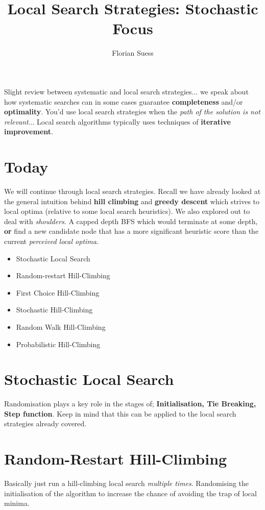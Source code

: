 \documentclass{article}
\begin{document}
\title{Local Search Strategies: Stochastic Focus}
\date{}
\author{Florian Suess}
\maketitle

Slight review between systematic and local search strategies... we speak about how systematic searches can in some cases guarantee \textbf{completeness} and/or \textbf{optimality}. You'd use local search strategies when the \emph{path of the solution is not relevant}... Local search algorithms typically uses techniques of \textbf{iterative improvement}.

\section{Today}
We will continue through local search strategies. Recall we have already looked at the general intuition behind \textbf{hill climbing} and \textbf{greedy descent} which strives to local optima (relative to some local search heuristics). We also explored out to deal with \emph{shoulders}. A capped depth BFS which would terminate at some depth, \textbf{or} find a new candidate node that has a more significant heuristic score than the current \emph{perceived local optima}.

\begin{itemize}
	\item Stochastic Local Search
	\item Random-restart Hill-Climbing
	\item First Choice Hill-Climbing
	\item Stochastic Hill-Climbing
	\item Random Walk Hill-Climbing
	\item Probabilistic Hill-Climbing
\end{itemize}

\section{Stochastic Local Search}
Randomisation plays a key role in the stages of; \textbf{Initialisation, Tie Breaking, Step function}. Keep in mind that this can be applied to the local search strategies already covered.

\section{Random-Restart Hill-Climbing}
Basically just run a hill-climbing local search \emph{multiple times}. Randomising the initialisation of the algorithm to increase the chance of avoiding the trap of local minima.
\end{document}
